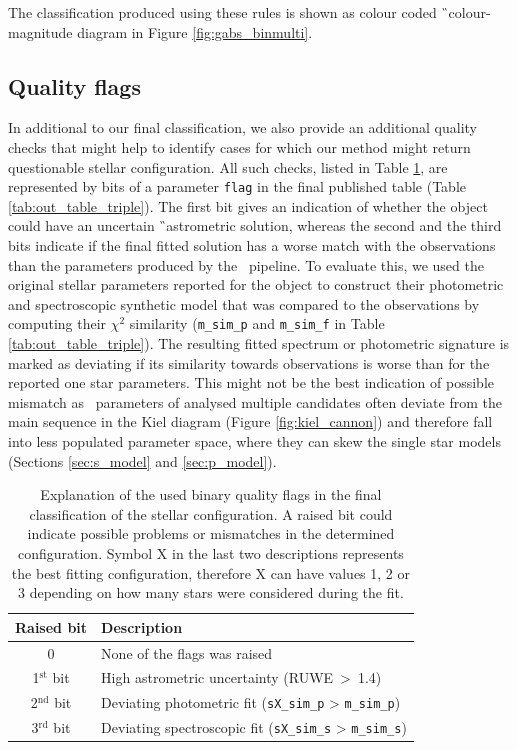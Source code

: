 The classification produced using these rules is shown as colour coded \G\ colour-magnitude diagram in Figure \ref{fig:gabs_binmulti}.

\subsection{Quality flags}
\label{sec:quaflags}
In additional to our final classification, we also provide an additional quality checks that might help to identify cases for which our method might return questionable stellar configuration. All such checks, listed in Table \ref{tab:q_flag}, are represented by bits of a parameter \texttt{flag} in the final published table (Table \ref{tab:out_table_triple}). The first bit gives an indication of whether the object could have an uncertain \G\ astrometric solution, whereas the second and the third bits indicate if the final fitted solution has a worse match with the observations than the parameters produced by the \TC\ pipeline. To evaluate this, we used the original stellar parameters reported for the object to construct their photometric and spectroscopic synthetic model that was compared to the observations by computing their $\chi^2$ similarity (\texttt{m\_sim\_p} and \texttt{m\_sim\_f} in Table \ref{tab:out_table_triple}). The resulting fitted spectrum or photometric signature is marked as deviating if its similarity towards observations is worse than for the reported one star parameters. This might not be the best indication of possible mismatch as \TC\ parameters of analysed multiple candidates often deviate from the main sequence in the Kiel diagram (Figure \ref{fig:kiel_cannon}) and therefore fall into less populated parameter space, where they can skew the single star models (Sections \ref{sec:s_model} and \ref{sec:p_model}).

\begin{table}
	\centering
	\caption{Explanation of the used binary quality flags in the final classification of the stellar configuration. A raised bit could indicate possible problems or mismatches in the determined configuration. Symbol X in the last two descriptions represents the best fitting configuration, therefore X can have values 1, 2 or 3 depending on how many stars were considered during the fit.}
	\begin{tabular}{c l}
		\hline
		Raised bit & Description \\ 
		\hline \hline
		0 & None of the flags was raised \\
		1$^{\text{st}}$ bit & High astrometric uncertainty (RUWE~>~1.4)\\
		2$^{\text{nd}}$ bit & Deviating photometric fit (\texttt{sX\_sim\_p} > \texttt{m\_sim\_p})\\
		3$^{\text{rd}}$ bit & Deviating spectroscopic fit (\texttt{sX\_sim\_s} > \texttt{m\_sim\_s})\\
		\hline
	\end{tabular}
	\label{tab:q_flag}
\end{table}

